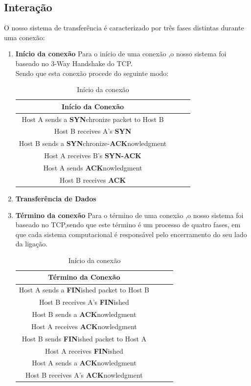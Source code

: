 \documentclass{article}
\begin{document}
\subsection{Interação}

O nosso sistema de transferência é caracterizado por três fases distintas durante uma conexão:
  \begin{enumerate}
  \item \textbf{Início da conexão}
 Para o início de uma conexão ,o nosso sistema foi baseado no 3-Way Handshake do TCP.\\
 Sendo que esta conexão procede do seguinte modo:

\begin{table}[h!]
\centering
\begin{tabular}{||c c c c||} 
\hline
\textbf{Início da Conexão} \\ [0.5ex] 
\hline\hline
Host A sends a \textbf{SYN}chronize packet to Host B \\ 
Host B receives A's \textbf{SYN}  \\
Host B sends a \textbf{SYN}chronize-\textbf{ACK}nowledgment\\
Host A receives B's \textbf{SYN-ACK}\\
Host A sends \textbf{ACK}nowledgment \\
Host B receives \textbf{ACK}\\ 
\hline
\end{tabular}
\caption{Início da conexão}
\label{table:1}
\end{table}


\item \textbf{Transferência de Dados}




\item \textbf{Término da conexão}
Para o término de uma conexão ,o nosso sistema foi baseado no TCP,sendo que este término
é um processo de quatro fases, em que cada sistema computacional é responsável pelo encerramento do seu 
lado da ligação.\\

\begin{table}[h!]
\centering
\begin{tabular}{||c c c c||} 
\hline
\textbf{Término da Conexão} \\ [0.5ex] 
\hline\hline
Host A sends a \textbf{FIN}ished packet to Host B \\ 
Host B receives A's \textbf{FIN}ished  \\
Host B sends a \textbf{ACK}nowledgment\\
Host A receives \textbf{ACK}nowledgment\\
Host B sends \textbf{FIN}ished packet to Host A \\
Host A receives \textbf{FIN}ished\\
Host A sends a \textbf{ACK}nowledgment\\
Host B receives A's \textbf{ACK}nowledgment  \\
\hline
\end{tabular}
\caption{Início da conexão}
\label{table:1}
\end{table}
\end{enumerate}
\end{document}
